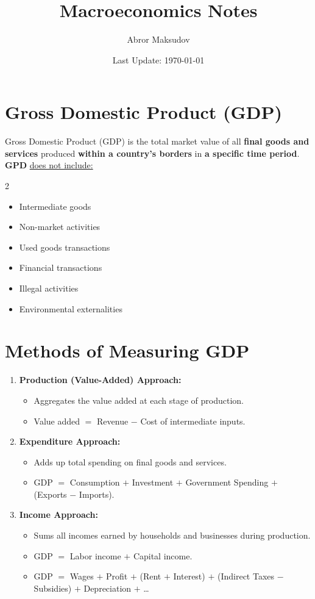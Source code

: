 \documentclass[a4paper, 11pt]{article}
\title{Macroeconomics Notes}
\author{Abror Maksudov}
\date{Last Update: \today}
\begin{document}
\maketitle
\tableofcontents

\section{Gross Domestic Product (GDP)}
Gross Domestic Product (GDP) is the total market value of all \textbf{final goods and services} produced \textbf{within a country’s borders} in \textbf{a specific time period}.\\[10pt]
\textbf{GPD} \underline{does not include:}
\begin{multicols}{2}
    \begin{itemize}
        \item Intermediate goods
        \item Non-market activities
        \item Used goods transactions
        \item Financial transactions
        \item Illegal activities
        \item Environmental externalities
    \end{itemize}
\end{multicols}

\section{Methods of Measuring GDP}
\begin{enumerate}
    \item \textbf{Production (Value-Added) Approach:} 
    \begin{itemize}
        \item Aggregates the value added at each stage of production.
        \item Value added $=$ Revenue $-$ Cost of intermediate inputs.
    \end{itemize}

    \item \textbf{Expenditure Approach:}
    \begin{itemize}
        \item Adds up total spending on final goods and services.
        \item GDP $=$ Consumption $+$ Investment $+$ Government Spending $+$ (Exports $-$ Imports).
    \end{itemize}

    \item \textbf{Income Approach:}
    \begin{itemize}
        \item Sums all incomes earned by households and businesses during production.
        \item GDP $=$ Labor income $+$ Capital income.
        \item GDP $=$ Wages $+$ Profit $+$ (Rent $+$ Interest) $+$ (Indirect Taxes $-$ Subsidies) $+$ Depreciation $+$ \dots
    \end{itemize}
\end{enumerate}
\end{document}
